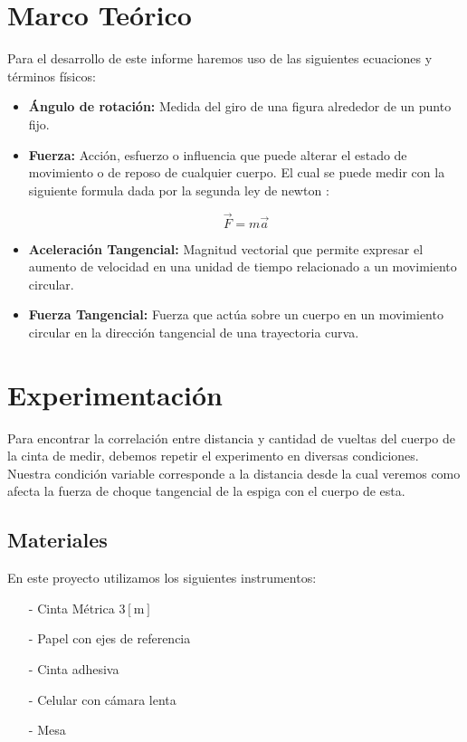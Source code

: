 \documentclass[11pt]{article}
\begin{document}
\section{Marco Teórico}
Para el desarrollo de este informe haremos uso de las siguientes ecuaciones y términos físicos:

\begin{itemize}
   
    \item \textbf{Ángulo de rotación:} Medida del giro de una figura alrededor de un punto fijo.\cite{angulo}
    
    \item \textbf{Fuerza:} Acción, esfuerzo o influencia que puede alterar el estado de movimiento o de reposo de cualquier cuerpo. El cual se puede medir con la siguiente formula dada por la segunda ley de newton \cite{fundamentos} :
        
        \begin{equation}
           \vec{F} = m \vec{a}
           \label{eq:fuerza}
        \end{equation} 
    
    \item \textbf{Aceleración Tangencial:} Magnitud vectorial que permite expresar el aumento de velocidad en una unidad de tiempo relacionado a un movimiento circular.
    
    \item \textbf{Fuerza Tangencial:} Fuerza que actúa sobre un cuerpo en un movimiento circular en la dirección tangencial de una trayectoria curva.

\end{itemize}

\section{Experimentación}
Para encontrar la correlación entre distancia y cantidad de vueltas del cuerpo de la cinta de medir, debemos repetir el experimento en diversas condiciones. Nuestra condición variable corresponde a la distancia desde la cual veremos como afecta la fuerza de choque tangencial de la espiga con el cuerpo de esta.

\subsection{Materiales}
En este proyecto utilizamos los siguientes instrumentos:
\begin{itemize}
    \item[-] Cinta Métrica 3$[\text{m}]$
    \item[-] Papel con ejes de referencia
    \item[-] Cinta adhesiva
    \item[-] Celular con cámara lenta
    \item[-] Mesa
\end{itemize}
    
\end{document}
